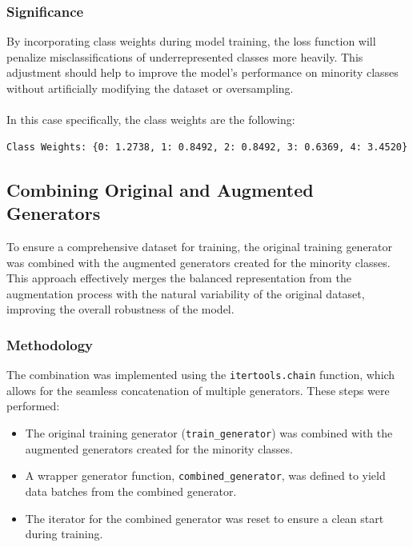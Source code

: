 \documentclass{article}
\begin{document}
\subsubsection{Significance}

By incorporating class weights during model training, the loss function will penalize misclassifications of underrepresented classes more heavily. This adjustment should help to improve the model's performance on minority classes without artificially modifying the dataset or oversampling.
\\\\
In this case specifically, the class weights are the following:

\begin{verbatim}
Class Weights: {0: 1.2738, 1: 0.8492, 2: 0.8492, 3: 0.6369, 4: 3.4520}
\end{verbatim}

\subsection{Combining Original and Augmented Generators}

To ensure a comprehensive dataset for training, the original training generator was combined with the augmented generators created for the minority classes. This approach effectively merges the balanced representation from the augmentation process with the natural variability of the original dataset, improving the overall robustness of the model.

\subsubsection{Methodology}

The combination was implemented using the \texttt{itertools.chain} function, which allows for the seamless concatenation of multiple generators. These steps were performed:
\begin{itemize}
    \item The original training generator (\texttt{train\_generator}) was combined with the augmented generators created for the minority classes.
    \item A wrapper generator function, \texttt{combined\_generator}, was defined to yield data batches from the combined generator.
    \item The iterator for the combined generator was reset to ensure a clean start during training.
\end{itemize}
\end{document}
